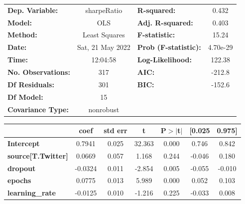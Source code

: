 \begin{center}
\begin{tabular}{lclc}
\toprule
\textbf{Dep. Variable:}              &   sharpeRatio    & \textbf{  R-squared:         } &     0.432   \\
\textbf{Model:}                      &       OLS        & \textbf{  Adj. R-squared:    } &     0.403   \\
\textbf{Method:}                     &  Least Squares   & \textbf{  F-statistic:       } &     15.24   \\
\textbf{Date:}                       & Sat, 21 May 2022 & \textbf{  Prob (F-statistic):} &  4.70e-29   \\
\textbf{Time:}                       &     12:04:58     & \textbf{  Log-Likelihood:    } &    122.38   \\
\textbf{No. Observations:}           &         317      & \textbf{  AIC:               } &    -212.8   \\
\textbf{Df Residuals:}               &         301      & \textbf{  BIC:               } &    -152.6   \\
\textbf{Df Model:}                   &          15      & \textbf{                     } &             \\
\textbf{Covariance Type:}            &    nonrobust     & \textbf{                     } &             \\
\bottomrule
\end{tabular}
\begin{tabular}{lcccccc}
                                     & \textbf{coef} & \textbf{std err} & \textbf{t} & \textbf{P$> |$t$|$} & \textbf{[0.025} & \textbf{0.975]}  \\
\midrule
\textbf{Intercept}                   &       0.7941  &        0.025     &    32.363  &         0.000        &        0.746    &        0.842     \\
\textbf{source[T.Twitter]}           &       0.0669  &        0.057     &     1.168  &         0.244        &       -0.046    &        0.180     \\
\textbf{dropout}                     &      -0.0324  &        0.011     &    -2.854  &         0.005        &       -0.055    &       -0.010     \\
\textbf{epochs}                      &       0.0775  &        0.013     &     5.989  &         0.000        &        0.052    &        0.103     \\
\textbf{learning\_rate}              &      -0.0125  &        0.010     &    -1.216  &         0.225        &       -0.033    &        0.008     \\

\end{tabular}
\end{center}
